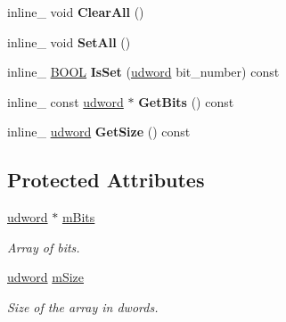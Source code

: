 \begin{DoxyCompactItemize}
\item 
\hypertarget{class_bit_array_a83c96d57cb1c83bae2c1f4cc85cad8cc}{inline\+\_\+ void {\bfseries Clear\+All} ()}\label{class_bit_array_a83c96d57cb1c83bae2c1f4cc85cad8cc}

\item 
\hypertarget{class_bit_array_a40244d65c1da183085f2fac9a4775382}{inline\+\_\+ void {\bfseries Set\+All} ()}\label{class_bit_array_a40244d65c1da183085f2fac9a4775382}

\item 
\hypertarget{class_bit_array_a2bd18f25d03217110094676f5b4ea3d4}{inline\+\_\+ \hyperlink{_ice_types_8h_a050c65e107f0c828f856a231f4b4e788}{B\+O\+O\+L} {\bfseries Is\+Set} (\hyperlink{_ice_types_8h_a44c6f1920ba5551225fb534f9d1a1733}{udword} bit\+\_\+number) const }\label{class_bit_array_a2bd18f25d03217110094676f5b4ea3d4}

\item 
\hypertarget{class_bit_array_a27a90f166b74655a071599631031a4e2}{inline\+\_\+ const \hyperlink{_ice_types_8h_a44c6f1920ba5551225fb534f9d1a1733}{udword} $\ast$ {\bfseries Get\+Bits} () const }\label{class_bit_array_a27a90f166b74655a071599631031a4e2}

\item 
\hypertarget{class_bit_array_a05d012082ee87e9169944659fbb17277}{inline\+\_\+ \hyperlink{_ice_types_8h_a44c6f1920ba5551225fb534f9d1a1733}{udword} {\bfseries Get\+Size} () const }\label{class_bit_array_a05d012082ee87e9169944659fbb17277}

\end{DoxyCompactItemize}
\subsection*{Protected Attributes}
\begin{DoxyCompactItemize}
\item 
\hypertarget{class_bit_array_a3e514766fb683c7a7a115679b580dc77}{\hyperlink{_ice_types_8h_a44c6f1920ba5551225fb534f9d1a1733}{udword} $\ast$ \hyperlink{class_bit_array_a3e514766fb683c7a7a115679b580dc77}{m\+Bits}}\label{class_bit_array_a3e514766fb683c7a7a115679b580dc77}

\begin{DoxyCompactList}\small\item\em Array of bits. \end{DoxyCompactList}\item 
\hypertarget{class_bit_array_a32c07ccdb818ee397aa253b8aee6dee2}{\hyperlink{_ice_types_8h_a44c6f1920ba5551225fb534f9d1a1733}{udword} \hyperlink{class_bit_array_a32c07ccdb818ee397aa253b8aee6dee2}{m\+Size}}\label{class_bit_array_a32c07ccdb818ee397aa253b8aee6dee2}

\begin{DoxyCompactList}\small\item\em Size of the array in dwords. \end{DoxyCompactList}\end{DoxyCompactItemize}



